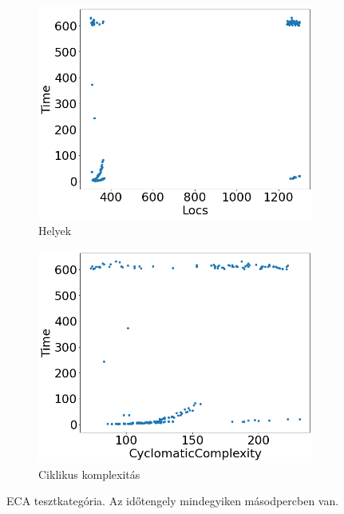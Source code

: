 \begin{figure}[ht]
\begin{subfigure}[b]{0.5\linewidth}
		\includegraphics[width=0.95\linewidth]{figures/eca/locs.png} 
		\caption{Helyek} 
		\label{fig7:c} 
	\end{subfigure}%
	\begin{subfigure}[b]{0.5\linewidth}
		\centering
		\includegraphics[width=0.95\linewidth]{figures/eca/cc.png} 
		\caption{Ciklikus komplexitás} 
		\label{fig7:d} 
	\end{subfigure} 
	\caption{ECA tesztkategória. Az időtengely mindegyiken másodpercben van.}
	\label{fig_eca} 
\end{figure}